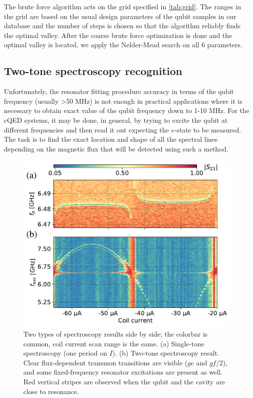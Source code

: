 \documentclass[%
 aip,
 amsmath,amssymb,
 reprint,%
]{revtex4-1}
\begin{document}
The brute force algorithm acts on the grid specified in \autoref{tab:grid}. The ranges in the grid are based on the usual design parameters of the qubit samples in our database and the number of steps is chosen so that the algorithm reliably finds the optimal valley. After the coarse brute force optimization is done and the optimal valley is located, we apply the Nelder-Mead search on all 6 parameters.


\subsection{Two-tone spectroscopy recognition}


Unfortunately, the resonator fitting procedure accuracy in terms of the qubit frequency (usually >50 MHz) is not enough in practical applications where it is necessary to obtain exact value of the qubit frequency down to 1-10 MHz. For the cQED systems, it may be done, in general, by trying to excite the qubit at different frequencies and then read it out expecting the $e$-state to be measured. The task is to find the exact location and shape of all the spectral lines depending on the magnetic flux that will be detected using such a method. 

\begin{figure}[b]
	\centering
	\includegraphics[width=\linewidth]{twotone}
	\caption{Two types of spectroscopy results side by side; the colorbar is common, coil current scan range is the same. (a) Single-tone spectroscopy (one period on $I$). (b) Two-tone spectroscopy result. Clear flux-dependent transmon transitions are visible ($ge$ and $gf/2$), and some fixed-frequency resonator excitations are present as well. Red vertical stripes are observed when the qubit and the cavity are close to resonance.}
	\label{fig:twotone}
\end{figure}
\end{document}
